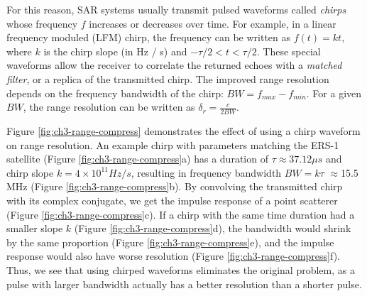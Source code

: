 For this reason, SAR systems usually transmit pulsed waveforms called \emph{chirps} whose frequency $f$ increases or decreases over time. For example, in a linear frequency moduled (LFM) chirp, the frequency can be written as $ f(t) = k t$, where $k$ is the chirp slope (in Hz / s) and $-\tau / 2 < t < \tau/2$.
These special waveforms allow the receiver to correlate the returned echoes with a \emph{matched filter}, or a replica of the transmitted chirp. The improved range resolution depends on the frequency bandwidth of the chirp: $BW = f_{max} - f_{min}$.
For a given $BW$, the range resolution can be written as $\delta_r = \frac{c}{2 BW}$. 


Figure \ref{fig:ch3-range-compress} demonstrates the effect of using a chirp waveform on range resolution. An example chirp with parameters matching the ERS-1 satellite (Figure \ref{fig:ch3-range-compress}a)
has a duration of $\tau \approx 37.12 \mu s$ and chirp slope $k = 4 \times 10^{11} Hz / s$, resulting in frequency bandwidth $BW = k \tau$ $\approx$15.5 MHz (Figure \ref{fig:ch3-range-compress}b). By convolving the transmitted chirp with its complex conjugate, we get the impulse response of a point scatterer (Figure \ref{fig:ch3-range-compress}c). If a chirp with the same time duration had a smaller slope $k$ (Figure \ref{fig:ch3-range-compress}d), the bandwidth would shrink by the same proportion (Figure \ref{fig:ch3-range-compress}e), and the impulse response would also have worse resolution (Figure \ref{fig:ch3-range-compress}f).
Thus, we see that using chirped waveforms eliminates the original problem, as a pulse with larger bandwidth actually has a better resolution than a shorter pulse.


